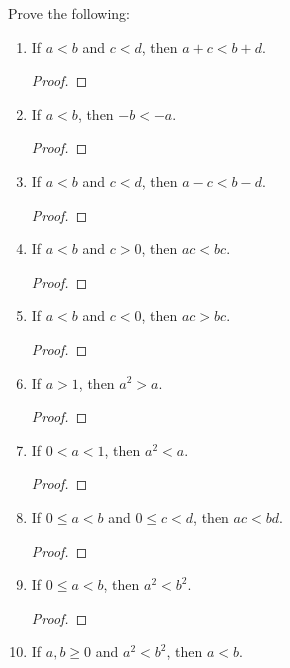 \begin{exercise}[\textbf{5}] Prove the following:
     \begin{enumerate}
         \item If $a<b$ and $c<d$, then $a+c<b+d$.
         \begin{proof}
              
         \end{proof}
         \item If $a<b$, then $-b<-a$.
         \begin{proof}
              
         \end{proof}
         \item If $a<b$ and $c<d$, then $a-c<b-d$.
         \begin{proof}
              
         \end{proof}
         \item If $a<b$ and $c>0$, then $ac<bc$.
         \begin{proof}
              
         \end{proof}
         \item If $a<b$ and $c<0$, then $ac>bc$.
         \begin{proof}
              
         \end{proof}
         \item If $a>1$, then $a^2>a$.
         \begin{proof}
              
         \end{proof}
         \item If $0<a<1$, then $a^2<a$.
         \begin{proof}
              
         \end{proof}
         \item If $0\leq a<b$ and $0\leq c<d$, then $ac<bd$.
         \begin{proof}
              
         \end{proof}
         \item If $0 \leq a<b$, then $a^2<b^2$.
         \begin{proof}
              
         \end{proof}
         \item If $a,b \geq 0$ and $a^2<b^2$, then $a<b$.
     \end{enumerate}
\end{exercise}